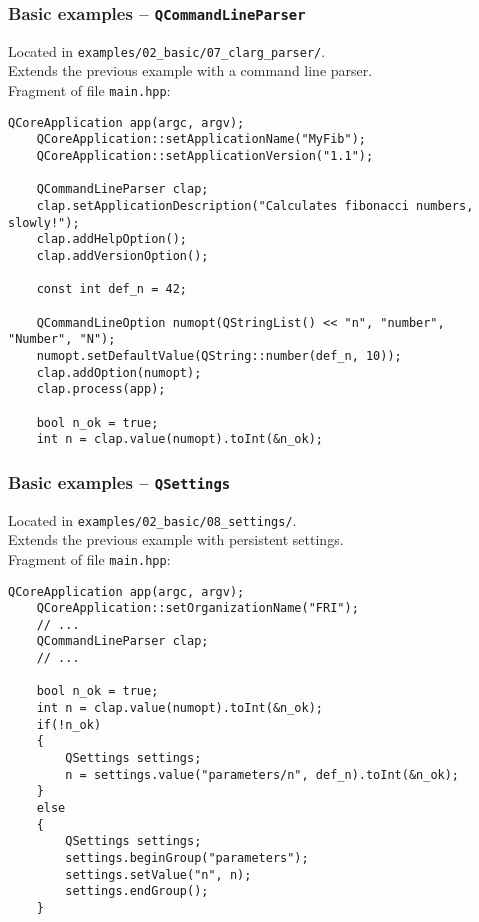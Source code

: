\begin{frame}[fragile]
  \frametitle{Basic examples -- \texttt{QCommandLineParser}}
  Located in \texttt{examples/02\_basic/07\_clarg\_parser/}.\\
  \small
  Extends the previous example with a command line parser.\\
  Fragment of file \texttt{main.hpp}:
  \begin{lstlisting}[basicstyle=\tiny\ttfamily]
	QCoreApplication app(argc, argv);
	QCoreApplication::setApplicationName("MyFib");
	QCoreApplication::setApplicationVersion("1.1");
	
	QCommandLineParser clap;
	clap.setApplicationDescription("Calculates fibonacci numbers, slowly!");
	clap.addHelpOption();
	clap.addVersionOption();

	const int def_n = 42;

	QCommandLineOption numopt(QStringList() << "n", "number", "Number", "N");
	numopt.setDefaultValue(QString::number(def_n, 10));
	clap.addOption(numopt);
	clap.process(app);

	bool n_ok = true;
	int n = clap.value(numopt).toInt(&n_ok);
  \end{lstlisting}
\end{frame}

\begin{frame}[fragile]
  \frametitle{Basic examples -- \texttt{QSettings}}
  Located in \texttt{examples/02\_basic/08\_settings/}.\\
  \small
  Extends the previous example with persistent settings.\\
  Fragment of file \texttt{main.hpp}:
  \begin{lstlisting}[basicstyle=\tiny\ttfamily]
	QCoreApplication app(argc, argv);
	QCoreApplication::setOrganizationName("FRI");
	// ...
	QCommandLineParser clap;
	// ...

	bool n_ok = true;
	int n = clap.value(numopt).toInt(&n_ok);
	if(!n_ok)
	{
	    QSettings settings;
	    n = settings.value("parameters/n", def_n).toInt(&n_ok);
	}
	else
	{
	    QSettings settings;
	    settings.beginGroup("parameters");
	    settings.setValue("n", n);
	    settings.endGroup();
	}
  \end{lstlisting}
\end{frame}

